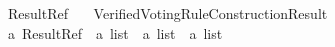 %
\begin{isabellebody}%
%
%
\isadelimtheory
%
\endisadelimtheory
%
\isatagtheory
{}\isamarkupfalse%
\ Result{\isacharunderscore}{\kern0pt}Ref\isanewline
\ \ \ {\isachardoublequoteopen}Verified{\isacharunderscore}{\kern0pt}Voting{\isacharunderscore}{\kern0pt}Rule{\isacharunderscore}{\kern0pt}Construction{\isachardot}{\kern0pt}Result{\isachardoublequoteclose}\isanewline
\isanewline
{}%
\endisatagtheory
{\isafoldtheory}%
%
\isadelimtheory
\isanewline
%
\endisadelimtheory
\isanewline
{}\isamarkupfalse%
\ {\isacharprime}{\kern0pt}a\ Result{\isacharunderscore}{\kern0pt}Ref\ {\isacharequal}{\kern0pt}\ {\isachardoublequoteopen}{\isacharprime}{\kern0pt}a\ list\ {\isacharasterisk}{\kern0pt}\ {\isacharprime}{\kern0pt}a\ list\ {\isacharasterisk}{\kern0pt}\ {\isacharprime}{\kern0pt}a\ list{\isachardoublequoteclose}\isanewline
%
\isadelimtheory
\isanewline
%
\endisadelimtheory
%
\isatagtheory
{}\isamarkupfalse%
%
\endisatagtheory
{\isafoldtheory}%
%
\isadelimtheory
%
\endisadelimtheory
%
\end{isabellebody}%
\endinput
